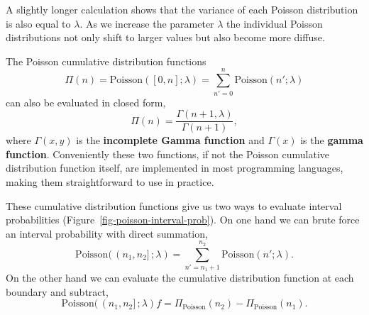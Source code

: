 \documentclass[
  letterpaper,
  DIV=11,
  numbers=noendperiod]{scrartcl}
\begin{document}
A slightly longer calculation shows that the variance of each Poisson
distribution is also equal to \(\lambda\). As we increase the parameter
\(\lambda\) the individual Poisson distributions not only shift to
larger values but also become more diffuse.

The Poisson cumulative distribution functions \[
\Pi(n)
= \mathrm{Poisson}([0, n]; \lambda)
= \sum_{n' = 0}^{n} \mathrm{Poisson}(n'; \lambda)
\] can also be evaluated in closed form, \[
\Pi(n) = \frac{ \Gamma(n + 1, \lambda) }{ \Gamma(n + 1) },
\] where \(\Gamma(x, y)\) is the \textbf{incomplete Gamma function} and
\(\Gamma(x)\) is the \textbf{gamma function}. Conveniently these two
functions, if not the Poisson cumulative distribution function itself,
are implemented in most programming languages, making them
straightforward to use in practice.

These cumulative distribution functions give us two ways to evaluate
interval probabilities (Figure~\ref{fig-poisson-interval-prob}). On one
hand we can brute force an interval probability with direct summation,
\[
\mathrm{Poisson}( \, (n_{1}, n_{2}] \, ; \lambda)
=
\sum_{n' = n_{1} + 1}^{n_{2}} \mathrm{Poisson}(n'; \lambda).
\] On the other hand we can evaluate the cumulative distribution
function at each boundary and subtract, \[
\mathrm{Poisson}( \, (n_{1}, n_{2}] \, ; \lambda) f
=
\Pi_{\mathrm{Poisson}}(n_{2}) - \Pi_{\mathrm{Poisson}}(n_{1}).
\]
\end{document}
